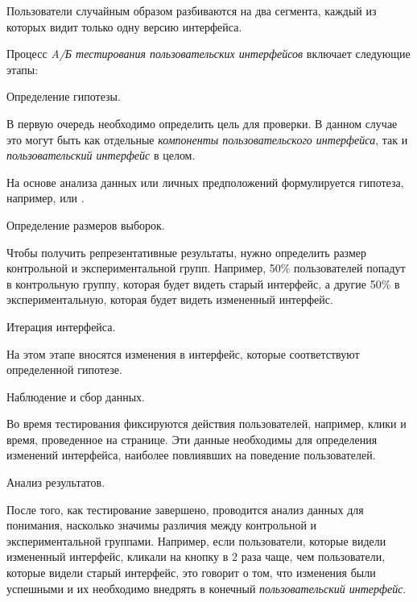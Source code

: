 {Пользователи случайным образом разбиваются на два сегмента, каждый из которых видит только одну версию интерфейса.

Процесс \textit{A/Б тестирования пользовательских интерфейсов} включает следующие этапы:

\begin{textitemize}
	\item Определение гипотезы. 
	
	В первую очередь необходимо определить цель для проверки. В данном случае это могут быть как отдельные \textit{компоненты пользовательского интерфейса}, так и \textit{пользовательский интерфейс} в целом.
	
	На основе анализа данных или личных предположений формулируется гипотеза, например,  или .
	
	\item Определение размеров выборок. 
	
	Чтобы получить репрезентативные результаты, нужно определить размер контрольной и экспериментальной групп. Например, 50\% пользователей попадут в контрольную группу, которая будет видеть старый интерфейс, а другие 50\% в экспериментальную, которая будет видеть измененный интерфейс.
	
	\item Итерация интерфейса. 
	
	На этом этапе вносятся изменения в интерфейс, которые соответствуют определенной гипотезе. 
	
	\item Наблюдение и сбор данных. 
	
	Во время тестирования фиксируются действия пользователей, например, клики и время, проведенное на странице. Эти данные необходимы для определения изменений интерфейса, наиболее повлиявших на поведение пользователей.
	
	\item Анализ результатов. 
	
	После того, как тестирование завершено, проводится анализ данных для понимания, насколько значимы различия между контрольной и экспериментальной группами. Например, если пользователи, которые видели измененный интерфейс, кликали на кнопку в 2 раза чаще, чем пользователи, которые видели старый интерфейс, это говорит о том, что изменения были успешными и их необходимо внедрять в конечный \textit{пользовательский интерфейс}.
\end{textitemize}

}
